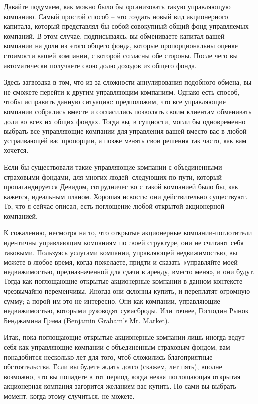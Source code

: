 \documentclass[ebook,12pt,oneside,openany]{memoir}
\begin{document}
Давайте подумаем, как можно было бы организовать такую управляющую
компанию. Самый простой способ – это создать новый вид акционерного
капитала, который представлял бы собой совокупный общий фонд
управляемых компаний. В этом случае, подписываясь, вы обмениваете
капитал вашей компании на доли из этого общего фонда, которые
пропорциональны оценке стоимости вашей компании, с которой согласны
обе стороны. После чего вы автоматически получаете свою долю доходов
из общего фонда.

Здесь загвоздка в том, что из-за сложности аннулирования подобного
обмена, вы не сможете перейти к другим управляющим компаниям. Однако
есть способ, чтобы исправить данную ситуацию: предположим, что все
управляющие компании собрались вместе и согласились позволять своим
клиентам обменивать доли во всех их общих фондах. Тогда вы, в
сущности, могли бы одновременно выбрать все управляющие компании для
управления вашей вместо вас в любой устраивающей вас пропорции, а
позже менять свои решения так часто, как вам хочется.

Если бы существовали такие управляющие компании с объединенными
страховыми фондами, для многих людей, следующих по пути, который
пропагандируется Девидом, сотрудничество с такой компанией было бы,
как кажется, идеальным планом. Хорошая новость: они действительно
существуют. То, что я сейчас описал, есть поглощение любой открытой
акционерной компанией.

К сожалению, несмотря на то, что открытые акционерные
компании-поглотители идентичны управляющим компаниям по своей
структуре, они не считают себя таковыми. Пользуясь услугами компании,
управляющей недвижимостью, вы можете в любое время, когда пожелаете,
придти и сказать «управляйте моей недвижимостью, предназначенной для
сдачи в аренду, вместо меня», и они будут. Тогда как поглощающие
открытые акционерные компании в данном контексте чрезвычайно
переменчивы. Иногда они склонны купить, и переплатят огромную сумму; а
порой им это не интересно. Они как компании, управляющие
недвижимостью, которыми руководят сумасброды. Или точнее, Господин
Рынок Бенджамина Грэма (Benjamin Graham's Mr. Market).

Итак, пока поглощающие открытые акционерные компании лишь иногда ведут
себя как управляющие компании с объединенным страховым фондом, вам
понадобится несколько лет для того, чтоб сложились благоприятные
обстоятельства. Если вы будете ждать долго (скажем, лет пять), вполне
возможно, что вы попадете в тот период, когда некая поглощающая
открытая акционерная компания загорится желанием вас купить. Но сами
вы выбрать момент, когда этому случиться, не можете.
\end{document}
